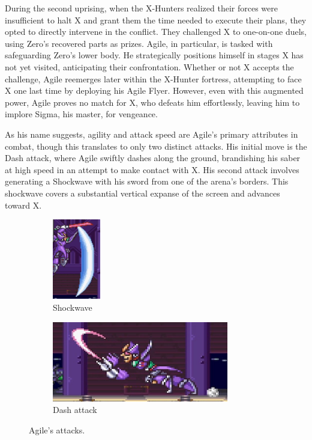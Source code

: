 During the second uprising, when the X-Hunters realized their forces were insufficient to halt X and grant them the time needed to execute their plans, they opted to directly intervene in the conflict. They challenged X to one-on-one duels, using Zero's recovered parts as prizes. Agile, in particular, is tasked with safeguarding Zero's lower body. He strategically positions himself in stages X has not yet visited, anticipating their confrontation. Whether or not X accepts the challenge, Agile reemerges later within the X-Hunter fortress, attempting to face X one last time by deploying his Agile Flyer. However, even with this augmented power, Agile proves no match for X, who defeats him effortlessly, leaving him to implore Sigma, his master, for vengeance.

As his name suggests, agility and attack speed are Agile's primary attributes in combat, though this translates to only two distinct attacks. His initial move is the Dash attack, where Agile swiftly dashes along the ground, brandishing his saber at high speed in an attempt to make contact with X. His second attack involves generating a Shockwave with his sword from one of the arena's borders. This shockwave covers a substantial vertical expanse of the screen and advances toward X.
\begin{figure}[htp]
	\centering
	\begin{subfigure}{0.2\linewidth}
		\centering
		\includegraphics[height=3.5cm]{figures/X2/Hunter_stages/Agile_crescent.png}
		\caption{Shockwave}	
	\end{subfigure}
	\begin{subfigure}{0.75\linewidth}
		\centering
		\includegraphics[height=3.5cm]{figures/X2/Hunter_stages/Agile_dash.png}
		\caption{Dash attack}
	\end{subfigure}
	\caption{Agile's attacks.}	
\end{figure}

